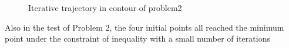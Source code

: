 \begin{figure}[H]
{}
\quad
{}
\caption{ Iterative trajectory in contour of problem2}
\end{figure}

Also in the test of Problem 2, the four initial points all reached the minimum point under the constraint of inequality with a small number of iterations
